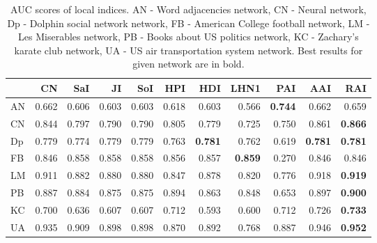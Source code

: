\documentclass{llncs}
\begin{document}
\begin{table}
\begin{center}
\caption{AUC scores of local indices. AN - Word adjacencies network\cite{adjnoun-net}, CN - Neural network\cite{celneur-net}, Dp - Dolphin social network network\cite{dolph-net}, FB - American College football network\cite{foot-net}, LM - Les Miserables network\cite{lesmis-net}, PB - Books about US politics network\cite{polbook-net}, KC - Zachary's karate club network\cite{karate-net}, UA - US air transportation system network\cite{usair-net}. Best results for given network are in bold.}
\begin{tabular}{l|rrrrrrrrrr}
{} &     CN &    SaI &     JI &    SoI &    HPI &    HDI &   LHN1 &    PAI &    AAI &    RAI \\ \hline
AN    &  0.662 &  0.606 &  0.603 &  0.603 &  0.618 &  0.603 &  0.566 &  \textbf{0.744} &  0.662 &  0.659 \\
CN &  0.844 &  0.797 &  0.790 &  0.790 &  0.805 &  0.779 &  0.725 &  0.750 &  0.861 &  \textbf{0.866} \\
Dp       &  0.779 &  0.774 &  0.779 &  0.779 &  0.763 &  \textbf{0.781} &  0.762 &  0.619 &  \textbf{0.781} &  \textbf{0.781} \\
FB      &  0.846 &  0.858 &  0.858 &  0.858 &  0.856 &  0.857 &  \textbf{0.859} &  0.270 &  0.846 &  0.846 \\
LM       &  0.911 &  0.882 &  0.880 &  0.880 &  0.847 &  0.878 &  0.820 &  0.776 &  0.918 &  \textbf{0.919} \\
PB       &  0.887 &  0.884 &  0.875 &  0.875 &  0.894 &  0.863 &  0.848 &  0.653 &  0.897 &  \textbf{0.900} \\
KC       &  0.700 &  0.636 &  0.607 &  0.607 &  0.712 &  0.593 &  0.600 &  0.712 &  0.726 &  \textbf{0.733} \\
UA      &  0.935 &  0.909 &  0.898 &  0.898 &  0.870 &  0.892 &  0.768 &  0.887 &  0.946 &  \textbf{0.952} \\
\end{tabular}
\end{center}
\end{table}
%
\setlength{\tabcolsep}{5pt}
\renewcommand{\arraystretch}{1.5}
\end{document}
